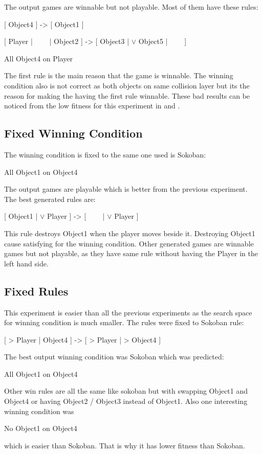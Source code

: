 
The output games are winnable but not playable. Most of them have these rules:
\begin{center}
[ Object4 ] -> [ Object1 ]
\end{center}
\begin{center}
[ Player | \ \ \ \ |  Object2 ] -> [  Object3 | $\vee$ Object5 | \ \ \ \ ]
\end{center}
\begin{center}
All Object4 on Player
\end{center}
The first rule is the main reason that the game is winnable. The winning condition also is not correct as both objects on same collision layer but its the reason for making the having the first rule winnable. These bad results can be noticed from the low fitness for this experiment in  and .

\subsection{Fixed Winning Condition}
The winning condition is fixed to the same one used is Sokoban:
\begin{center}
All Object1 on Object4
\end{center}

The output games are playable which is better from the previous experiment. The best generated rules are:
\begin{center}
[  Object1 | $\vee$ Player ] -> [ \ \ \ \ | $\vee$ Player ]
\end{center}
This rule destroys Object1 when the player moves beside it. Destroying Object1 cause satisfying for the winning condition. Other generated games are winnable games but not playable, as they have same rule without having the Player in the left hand side.

\subsection{Fixed Rules}
This experiment is easier than all the previous experiments as the search space for winning condition is much smaller. The rules were fixed to Sokoban rule:
\begin{center}
[ > Player | Object4 ] -> [ > Player | > Object4 ]
\end{center}

The best output winning condition was Sokoban which was predicted:
\begin{center}
All Object1 on Object4
\end{center}
Other win rules are all the same like sokoban but with swapping Object1 and Object4 or having Object2 / Object3 instead of Object1. Also one interesting winning condition was 
\begin{center}
No Object1 on Object4
\end{center}
which is easier than Sokoban. That is why it has lower fitness than Sokoban.